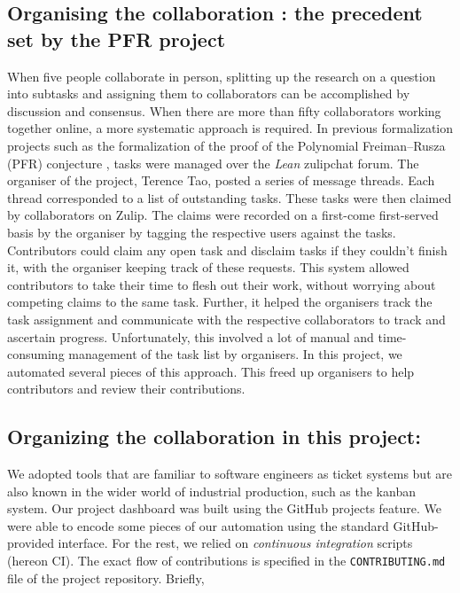 \subsection{Organising the collaboration : the precedent set by the PFR project}
When five people collaborate in person, splitting up the research on a question into subtasks and assigning them to collaborators can be accomplished by discussion and consensus. When there are more than fifty collaborators working together online, a more systematic approach is required. In previous formalization projects such as the formalization of the proof of the Polynomial Freiman--Rusza (PFR) conjecture \cite{PFR_Tao_Dilles_2023}, tasks were managed over the \emph{Lean} zulipchat forum. The organiser of the project, Terence Tao, posted a series of message threads. Each thread corresponded to a list of outstanding tasks. These tasks were then claimed by collaborators on Zulip. The claims were recorded on a first-come first-served basis by the organiser by tagging the respective users against the tasks. Contributors could claim any open task and disclaim tasks if they couldn't finish it, with the organiser keeping track of these requests. This system allowed contributors to take their time to flesh out their work, without worrying about competing claims to the same task. Further, it helped the organisers track the task assignment and communicate with the respective collaborators to track and ascertain progress. Unfortunately, this involved a lot of manual and time-consuming management of the task list by organisers. In this project, we automated several pieces of this approach. This freed up organisers to help contributors and review their contributions.

\subsection{Organizing the collaboration in this project:}
We adopted tools that are familiar to software engineers as ticket systems but are also known in the wider world of industrial production, such as the kanban system. Our project dashboard was built using the GitHub projects feature. We were able to encode some pieces of our automation using the standard GitHub-provided interface. For the rest, we relied on \emph{continuous integration} scripts (hereon CI). The exact flow of contributions is specified in the \texttt{CONTRIBUTING.md} file of the project repository\cite{The_Equational_Theories_repository}. Briefly,

